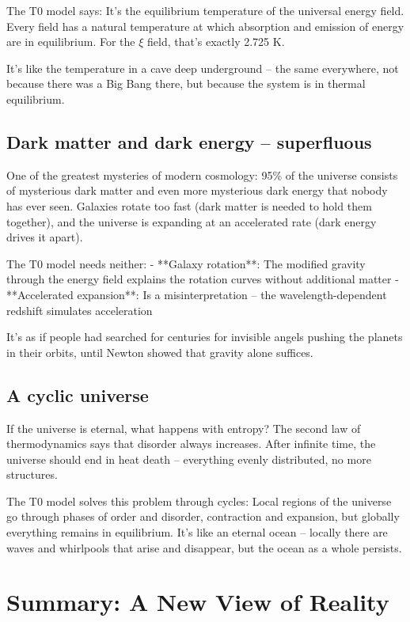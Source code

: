 \documentclass[12pt,a4paper]{article}
\newcommand{\xipar}{\ensuremath{\xi}}
\begin{document}
	The T0 model says: It's the equilibrium temperature of the universal energy field. Every field has a natural temperature at which absorption and emission of energy are in equilibrium. For the $\xipar$ field, that's exactly 2.725 K.
	
	It's like the temperature in a cave deep underground -- the same everywhere, not because there was a Big Bang there, but because the system is in thermal equilibrium.
	
	\subsection{Dark matter and dark energy -- superfluous}
	
	One of the greatest mysteries of modern cosmology: 95\% of the universe consists of mysterious dark matter and even more mysterious dark energy that nobody has ever seen. Galaxies rotate too fast (dark matter is needed to hold them together), and the universe is expanding at an accelerated rate (dark energy drives it apart).
	
	The T0 model needs neither:
	- **Galaxy rotation**: The modified gravity through the energy field explains the rotation curves without additional matter
	- **Accelerated expansion**: Is a misinterpretation -- the wavelength-dependent redshift simulates acceleration
	
	It's as if people had searched for centuries for invisible angels pushing the planets in their orbits, until Newton showed that gravity alone suffices.
	
	\subsection{A cyclic universe}
	
	If the universe is eternal, what happens with entropy? The second law of thermodynamics says that disorder always increases. After infinite time, the universe should end in heat death -- everything evenly distributed, no more structures.
	
	The T0 model solves this problem through cycles: Local regions of the universe go through phases of order and disorder, contraction and expansion, but globally everything remains in equilibrium. It's like an eternal ocean -- locally there are waves and whirlpools that arise and disappear, but the ocean as a whole persists.
	
	\section{Summary: A New View of Reality}
	
\end{document}
